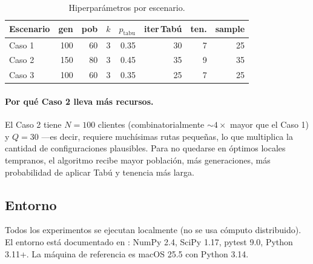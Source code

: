 \begin{table}[H]
\centering
\small
\caption{Hiperparámetros por escenario.}
\begin{tabular}{lrrrrrrr}
\toprule
Escenario & gen & pob & $k$ & $p_{\mathrm{tabu}}$ & iter\,Tabú & ten. & sample \\
\midrule
Caso 1 & 100 & 60 & 3 & 0.35 & 30 & 7 & 25 \\
Caso 2 & 150 & 80 & 3 & 0.45 & 35 & 9 & 35 \\
Caso 3 & 100 & 60 & 3 & 0.35 & 25 & 7 & 25 \\
\bottomrule
\end{tabular}
\end{table}

\paragraph{Por qué Caso 2 lleva más recursos.} El Caso 2 tiene $N = 100$ clientes (combinatorialmente $\sim 4 \times$ mayor que el Caso 1) y $Q = 30$ —es decir, requiere muchísimas rutas pequeñas, lo que multiplica la cantidad de configuraciones plausibles. Para no quedarse en óptimos locales tempranos, el algoritmo recibe mayor población, más generaciones, más probabilidad de aplicar Tabú y tenencia más larga.

\subsection{Entorno}

Todos los experimentos se ejecutan localmente (no se usa cómputo distribuido). El entorno está documentado en : NumPy 2.4, SciPy 1.17, pytest 9.0, Python 3.11+. La máquina de referencia es macOS 25.5 con Python 3.14.
